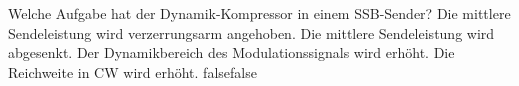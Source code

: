     {Welche Aufgabe hat der Dynamik-Kompressor in einem SSB-Sender?}
    {Die mittlere Sendeleistung wird verzerrungsarm angehoben.}
    {Die mittlere Sendeleistung wird abgesenkt.}
    {Der Dynamikbereich des Modulationssignals wird erhöht.}
    {Die Reichweite in CW wird erhöht.}
    {false}{false}